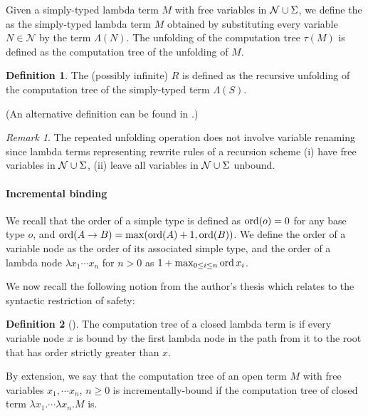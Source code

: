\documentclass[a4paper]{article}[12pt]
\theoremstyle{remark}
\newtheorem{remark}{Remark}[section]
\theoremstyle{definition}
\newtheorem{definition}{Definition}[section]
\begin{document}
Given a simply-typed lambda term $M$ with free variables in $\mathcal{N} \cup \Sigma$, we define the  as the simply-typed lambda term $M$ obtained by substituting every variable $N \in \mathcal{N}$ by the term $\Lambda (N)$. The unfolding of the computation tree $\tau(M)$ is defined as the computation tree of the unfolding of $M$.

\begin{definition}
The (possibly infinite)  $R$ is defined as the recursive unfolding
of the computation tree of the simply-typed term $\Lambda(S)$.

(An alternative definition can be found in \cite{OngLics2006}.)
\end{definition}
\begin{remark} The repeated unfolding operation does not involve variable renaming since lambda terms representing rewrite rules of a recursion scheme (i) have free variables in $\mathcal{N} \cup \Sigma$, (ii) leave all variables in $\mathcal{N} \cup \Sigma$ unbound.
\end{remark}

\paragraph{Incremental binding}
We recall that the order of a simple type is defined as $\mathop{\mathrm{ord}}(o) = 0$ for any base type $o$, and $\mathop{\mathrm{ord}}(A \rightarrow B) = \max(\mathop{\mathrm{ord}}(A)+1, \mathop{\mathrm{ord}}(B))$. We define the order of a variable node as the order of its associated simple type, and the order of a lambda node $\lambda x_1 \cdots x_n$ for $n>0$ as $1 + \max_{0\leq i\leq n} \mathop{\mathrm{ord}}{x_i}$.

We now recall the following notion from the author's thesis \cite{BlumPhd,blumong:safelambdacalculus} which relates to the syntactic restriction of safety:
\begin{definition}[\cite{BlumPhd,blumong:safelambdacalculus}]
The computation tree of a closed lambda term is  if every variable node $x$ is bound by the first lambda node in the path from it to the root that has order strictly greater than $x$.

By extension, we say that the computation tree of an open term $M$ with free variables $x_1, \cdots x_n$, $n\geq 0$ is incrementally-bound if the computation tree of closed term $\lambda x_1 . \cdots \lambda x_n . M$ is.
\end{definition}
\end{document}
